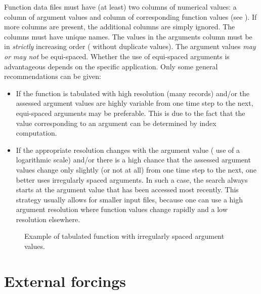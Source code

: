 Function data files must have (at least) two columns of numerical values: a column of argument values and column of corresponding function values (see ). If more columns are present, the additional columns are simply ignored. The columns must have unique names. The values in the arguments column must be in \emph{strictly} increasing order (\ie{} without duplicate values). The argument values \emph{may or may not} be equi-spaced. Whether the use of equi-spaced arguments is advantageous depends on the specific application. Only some general recommendations can be given:
\begin{itemize}
  \item If the function is tabulated with high resolution (many records) and/or the assessed argument values are highly variable from one time step to the next, equi-spaced arguments may be preferable. This is due to the fact that the value corresponding to an argument can be determined by index computation.
  \item If the appropriate resolution changes with the argument value (\eg{} use of a logarithmic scale) and/or there is a high chance that the assessed argument values change only slightly (or not at all) from one time step to the next, one better uses irregularly spaced arguments. In such a case, the search always starts at the argument value that has been accessed most recently. This strategy usually allows for smaller input files, because one can use a high argument resolution where function values change rapidly and a low resolution elsewhere.
\end{itemize}

\begin{figure*}[htbp]
  
  \caption{Example of tabulated function with irregularly spaced argument values. \label{fig:input-functions}}
\end{figure*}


\FloatBarrier

\section{External forcings} \label{sec:input-external}

